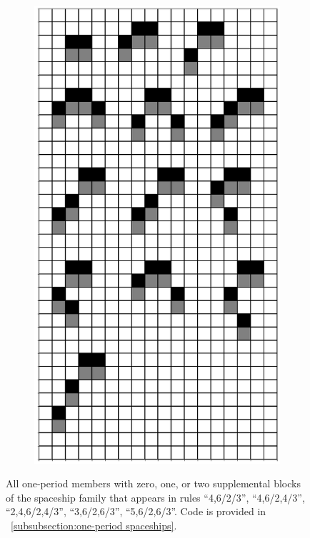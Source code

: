 \documentclass[12pt]{article}
\numberwithin{figure}{section} %
\begin{document}
\begin{figure}[H]
     	\begin{subfigure}{0.49\textwidth}
     		\centering
     		\includegraphics[width=\linewidth]{Section4/1.1}
   	\end{subfigure}
   	\caption[One-period spaceships]{All one-period members with zero, one, or two supplemental blocks of the spaceship family that appears in rules “4,6/2/3”, “4,6/2,4/3”, “2,4,6/2,4/3”, “3,6/2,6/3”, “5,6/2,6/3”. Code is provided in ~\ref{subsubsection:one-period spaceships}.}
   	\label{fig:one-period spaceships}
   	\vspace{-1.5em}
\end{figure}
\end{document}
